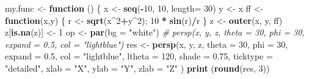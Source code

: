 \documentclass[
]{book}
\newenvironment{Shaded}{\begin{snugshade}}{\end{snugshade}}
\newcommand{\AttributeTok}[1]{\textcolor[rgb]{0.13,0.29,0.53}{#1}}
\newcommand{\CommentTok}[1]{\textcolor[rgb]{0.56,0.35,0.01}{\textit{#1}}}
\newcommand{\ControlFlowTok}[1]{\textcolor[rgb]{0.13,0.29,0.53}{\textbf{#1}}}
\newcommand{\DecValTok}[1]{\textcolor[rgb]{0.00,0.00,0.81}{#1}}
\newcommand{\FloatTok}[1]{\textcolor[rgb]{0.00,0.00,0.81}{#1}}
\newcommand{\FunctionTok}[1]{\textcolor[rgb]{0.13,0.29,0.53}{\textbf{#1}}}
\newcommand{\NormalTok}[1]{#1}
\newcommand{\OtherTok}[1]{\textcolor[rgb]{0.56,0.35,0.01}{#1}}
\newcommand{\SpecialCharTok}[1]{\textcolor[rgb]{0.81,0.36,0.00}{\textbf{#1}}}
\newcommand{\StringTok}[1]{\textcolor[rgb]{0.31,0.60,0.02}{#1}}
\begin{document}
\begin{Shaded}
\begin{Highlighting}[]
\NormalTok{my.func }\OtherTok{\textless{}{-}} \ControlFlowTok{function}\NormalTok{ () }
\NormalTok{\{ x }\OtherTok{\textless{}{-}} \FunctionTok{seq}\NormalTok{(}\SpecialCharTok{{-}}\DecValTok{10}\NormalTok{, }\DecValTok{10}\NormalTok{, }\AttributeTok{length=} \DecValTok{30}\NormalTok{)}
\NormalTok{  y }\OtherTok{\textless{}{-}}\NormalTok{ x}
\NormalTok{  ff }\OtherTok{\textless{}{-}} \ControlFlowTok{function}\NormalTok{(x,y) \{ r }\OtherTok{\textless{}{-}} \FunctionTok{sqrt}\NormalTok{(x}\SpecialCharTok{\^{}}\DecValTok{2}\SpecialCharTok{+}\NormalTok{y}\SpecialCharTok{\^{}}\DecValTok{2}\NormalTok{); }\DecValTok{10} \SpecialCharTok{*} \FunctionTok{sin}\NormalTok{(r)}\SpecialCharTok{/}\NormalTok{r \}}
\NormalTok{  z }\OtherTok{\textless{}{-}} \FunctionTok{outer}\NormalTok{(x, y, ff)}
\NormalTok{  z[}\FunctionTok{is.na}\NormalTok{(z)] }\OtherTok{\textless{}{-}} \DecValTok{1}
\NormalTok{  op }\OtherTok{\textless{}{-}} \FunctionTok{par}\NormalTok{(}\AttributeTok{bg =} \StringTok{"white"}\NormalTok{)}
\CommentTok{\#  persp(x, y, z, theta = 30, phi = 30, expand = 0.5, col = "lightblue")}
\NormalTok{  res }\OtherTok{\textless{}{-}} \FunctionTok{persp}\NormalTok{(x, y, z, }\AttributeTok{theta =} \DecValTok{30}\NormalTok{, }\AttributeTok{phi =} \DecValTok{30}\NormalTok{, }\AttributeTok{expand =} \FloatTok{0.5}\NormalTok{, }\AttributeTok{col =} \StringTok{"lightblue"}\NormalTok{, }
               \AttributeTok{ltheta =} \DecValTok{120}\NormalTok{, }\AttributeTok{shade =} \FloatTok{0.75}\NormalTok{, }\AttributeTok{ticktype =} \StringTok{"detailed"}\NormalTok{, }\AttributeTok{xlab =} \StringTok{"X"}\NormalTok{, }
               \AttributeTok{ylab =} \StringTok{"Y"}\NormalTok{, }\AttributeTok{zlab =} \StringTok{"Z"}\NormalTok{ ) }
  \FunctionTok{print}\NormalTok{ (}\FunctionTok{round}\NormalTok{(res, }\DecValTok{3}\NormalTok{))}
  

\end{Highlighting}
\end{Shaded}
\end{document}

